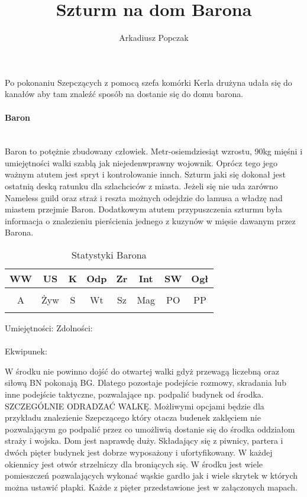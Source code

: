 \documentclass{article}
\title{\Huge{Szturm na dom Barona}}
\author{Arkadiusz Popczak}
\begin{document}
\maketitle

Po pokonaniu Szepczących z pomocą szefa komórki Kerla drużyna udała się do kanałów aby tam znaleźć sposób na dostanie się do domu barona. \\
\paragraph{\Large{Baron}}\mbox{}\\

\indent
Baron to potężnie zbudowany człowiek. Metr-osiemdziesiąt wzrostu, 90kg mięśni i umiejętności walki szablą jak niejedenwprawny wojownik. Oprócz tego jego ważnym atutem jest spryt i kontrolowanie innch. Szturm jaki się dokonał jest ostatnią deską ratunku dla szlachciców z miasta. Jeżeli się nie uda zarówno Nameless guild oraz straż i reszta możnych odejdzie do lamusa a władzę nad miastem przejmie Baron. Dodatkowym atutem przypuszczenia szturmu była informacja o znalezieniu pierścienia jednego z kuzynów w mięsie dawanym przez Barona.

\begin{table}[h]
\caption{Statystyki Barona}
\centering
    \begin{tabular}{|c|c|c|c|c|c|c|c|}
        \hline
        WW & US & K & Odp & Zr & Int & SW & Ogł \\ \hline
         &  &  &  &  &  &  &  \\ \hline
        A & Żyw & S & Wt & Sz & Mag & PO & PP \\ \hline
         &  &  &  &  &  &  &  \\ \hline
        \end{tabular}
\end{table}
\noindent
Umiejętności:
\hspace{150pt}
Zdolności:\\
\vspace{50pt}\\
Ekwipunek:\\
\vspace{50pt}

W środku nie powinno dojść do otwartej walki gdyż przewagą liczebną oraz siłową BN pokonają BG. Dlatego pozostaje podejście rozmowy, skradania lub inne podejście taktyczne, pozwalające np. podpalić budynek od środka. SZCZEGÓLNIE ODRADZAĆ WALKĘ. Możliwymi opcjami będzie dla przykładu znalezienie Szepczącego który otacza budenek zaklęciem nie pozwalającym go podpalić przez co umożliwią dostanie się do środka oddziałom straży i wojska. Dom jest naprawdę duży. Składający się z piwnicy, partera i dwóch pięter budynek jest dobrze wyposażony i ufortyfikowany. W każdej okiennicy jest otwór strzelniczy dla broniących się. W środku jest wiele pomieszczeń pozwalających wykonać wąskie gardło jak i wiele skrytek w których można ustawić płapki. Każde z pięter przedstawione jest w załączonych mapach. 
\end{document}
